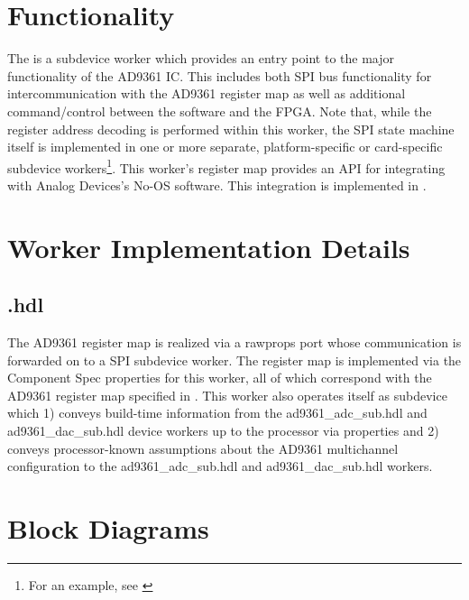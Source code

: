 \section{Functionality}
  The \Comp{} is a subdevice worker which provides an entry point to the major functionality of the AD9361 IC\cite{ad9361}. This includes both SPI bus functionality for intercommunication with the AD9361 register map as well as additional command/control between the software and the FPGA. Note that, while the register address decoding is performed within this worker, the SPI state machine itself is implemented in one or more separate, platform-specific or card-specific subdevice workers\footnote{For an example, see \cite{spi_comp_datasheet}}. This worker's register map provides an API for integrating with Analog Devices's No-OS software\cite{no_os}. This integration is implemented in \cite{config_proxy_comp_datasheet}.

\section{Worker Implementation Details}
\subsection{\comp.hdl}
The AD9361 register map is realized via a rawprops port whose communication is forwarded on to a SPI subdevice worker. The register map is implemented via the Component Spec properties for this worker, all of which correspond with the AD9361 register map specified in \cite{adi_ug671}. This worker also operates itself as subdevice which 1) conveys build-time information from the ad9361\_adc\_sub.hdl and ad9361\_dac\_sub.hdl device workers up to the processor via properties and 2) conveys processor-known assumptions about the AD9361 multichannel configuration to the ad9361\_adc\_sub.hdl and ad9361\_dac\_sub.hdl workers.

\section{Block Diagrams}
